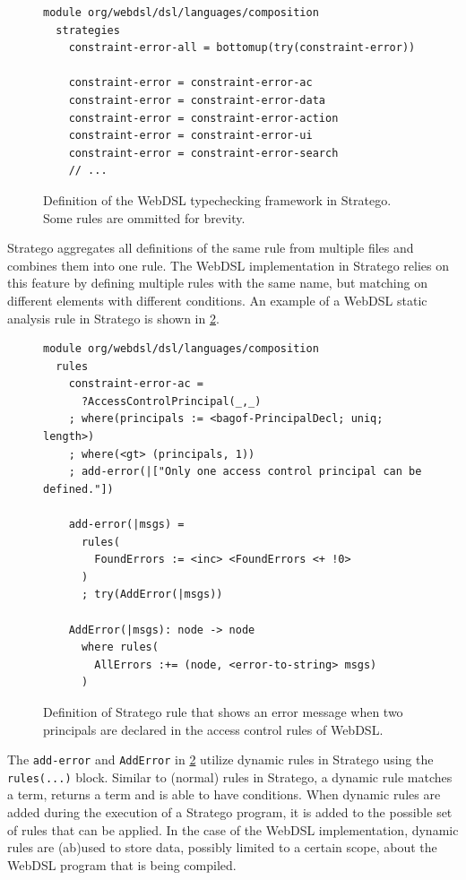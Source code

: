       \begin{figure}
        \begin{verbatim}
module org/webdsl/dsl/languages/composition
  strategies
    constraint-error-all = bottomup(try(constraint-error))

    constraint-error = constraint-error-ac
    constraint-error = constraint-error-data
    constraint-error = constraint-error-action
    constraint-error = constraint-error-ui
    constraint-error = constraint-error-search
    // ...
        \end{verbatim}
        \caption{\label{fig:webdsl-stratego-constraint-error}Definition of the WebDSL typechecking framework in Stratego. Some rules are ommitted for brevity.}
      \end{figure}

      Stratego aggregates all definitions of the same rule from multiple files and combines them into one rule. The WebDSL implementation in Stratego relies on this feature by defining multiple rules with the same name, but matching on different elements with different conditions. An example of a WebDSL static analysis rule in Stratego is shown in \cref{fig:webdsl-stratego-typecheck}.

      \begin{figure}
        \begin{verbatim}
module org/webdsl/dsl/languages/composition
  rules
    constraint-error-ac =
      ?AccessControlPrincipal(_,_)
    ; where(principals := <bagof-PrincipalDecl; uniq; length>)
    ; where(<gt> (principals, 1))
    ; add-error(|["Only one access control principal can be defined."])

    add-error(|msgs) =
      rules(
        FoundErrors := <inc> <FoundErrors <+ !0>
      )
      ; try(AddError(|msgs))

    AddError(|msgs): node -> node
      where rules(
        AllErrors :+= (node, <error-to-string> msgs)
      )
        \end{verbatim}
        \caption{\label{fig:webdsl-stratego-typecheck}Definition of Stratego rule that shows an error message when two principals are declared in the access control rules of WebDSL.}
      \end{figure}

      The \texttt{add-error} and \texttt{AddError} in \cref{fig:webdsl-stratego-typecheck} utilize dynamic rules in Stratego using the \texttt{rules(...)} block. Similar to (normal) rules in Stratego, a dynamic rule matches a term, returns a term and is able to have conditions. When dynamic rules are added during the execution of a Stratego program, it is added to the possible set of rules that can be applied. In the case of the WebDSL implementation, dynamic rules are (ab)used to store data, possibly limited to a certain scope, about the WebDSL program that is being compiled.

